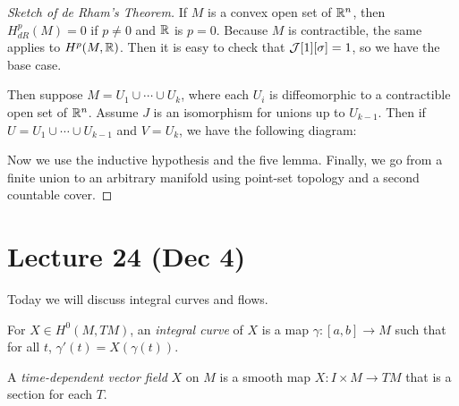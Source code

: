 \documentclass[twoside, 10pt]{article}
\begin{document}
    \begin{proof}[Sketch of de Rham's Theorem]
        If $M$ is a convex open set of $\mathbb{R}^n$, then $H^p_{dR}(M) = 0$ if $p \neq 0$ and $\mathbb{R}$ is $p=0$. Because $M$ is contractible, the same applies to $H^p(M, \mathbb{R})$. Then it is easy to check that $\mathcal{J}[1][\sigma] = 1$, so we have the base case.

        Then suppose $M = U_1 \cup \cdots \cup U_k$, where each $U_i$ is diffeomorphic to a contractible open set of $\mathbb{R}^n$. Assume $J$ is an isomorphism for unions up to $U_{k-1}$. Then if $U = U_1 \cup \cdots \cup U_{k-1}$ and $V = U_k$, we have the following diagram:

        \begin{center}
        \end{center}

        Now we use the inductive hypothesis and the five lemma. Finally, we go from a finite union to an arbitrary manifold using point-set topology and a second countable cover.
    \end{proof}

    \section{Lecture 24 (Dec 4)}%
    \label{sec:lecture_24_dec_4_}
    
    Today we will discuss integral curves and flows. 

    \begin{defn}
        For $X \in H^0(M, TM)$, an \textit{integral curve} of $X$ is a map $\gamma: [a,b] \to M$ such that for all $t$, $\gamma'(t) = X(\gamma(t))$.
    \end{defn}

    \begin{defn}
        A \textit{time-dependent vector field} $X$ on $M$ is a smooth map $X: I \times M \to TM$ that is a section for each $T$.
    \end{defn}
\end{document}
